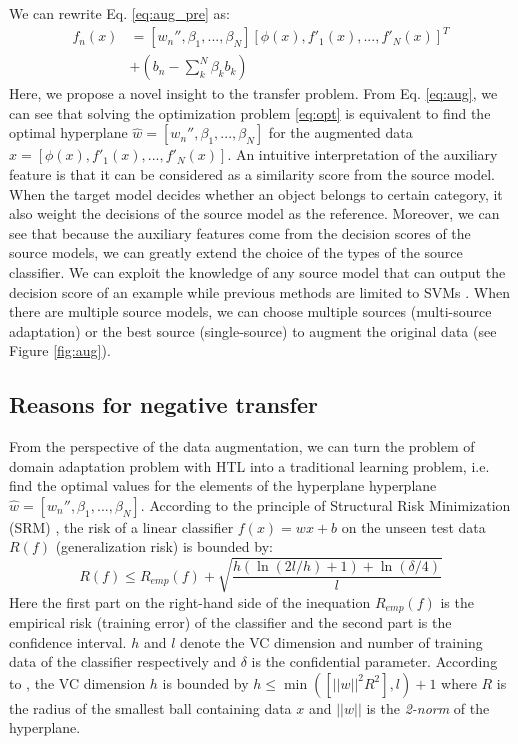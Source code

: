 We can rewrite Eq. \eqref{eq:aug_pre} as:
\begin{equation}\label{eq:aug}
\begin{aligned}
f_n(x)&= [w_{n}'',\beta_1,...,\beta_N][\phi(x),f'_1(x),...,f'_N(x)]^T\\&+(b_n-\sum\limits_k^N{\beta _kb_k})
\end{aligned}
\end{equation}
Here, we propose a novel insight to the transfer problem. From Eq. \eqref{eq:aug}, we can see that solving the optimization problem \eqref{eq:opt} is equivalent to find the optimal hyperplane $\hat{w}=[w_{n}'',\beta_1,...,\beta_N]$ for the augmented data $\hat{x}=[\phi(x),f'_1(x),...,f'_N(x)]$. An intuitive interpretation of the auxiliary feature is that it can be considered as a similarity score from the source model. When the target model decides whether an object belongs to certain category, it also weight the decisions of the source model as the reference.
Moreover, we can see that because the auxiliary features come from the decision scores of the source models, we can greatly extend the choice of the types of the source classifier. We can exploit the knowledge of any source model that can output the decision score of an example while previous methods are limited to SVMs \cite{tommasi2014learning} \cite{kuzborskij2013n}. When there are multiple source models, we can choose multiple sources (multi-source adaptation) or the best source (single-source) to augment the original data (see Figure \ref{fig:aug}).



\subsection{Reasons for negative transfer}
From the perspective of the data augmentation, we can turn the problem of domain adaptation problem with HTL into a traditional learning problem, i.e. find the optimal values for the elements of the hyperplane hyperplane $\hat{w}=[w_{n}'',\beta_1,...,\beta_N]$. According to the principle of Structural Risk Minimization (SRM) \cite{vapnik1999overview}, the risk of a linear classifier $f(x)=wx+b$ on the unseen test data $R(f)$ (generalization risk) is bounded by:
\begin{equation}\label{eq:srm}
R(f) \le {R_{emp}}(f) + \sqrt {\frac{{h(\ln (2l/h) + 1) + \ln (\delta /4)}}{l}} 
\end{equation}
Here the first part on the right-hand side of the inequation ${R_{emp}}(f)$ is the empirical risk (training error) of the classifier and the second part is the confidence interval. $h$ and $l$ denote the VC dimension and number of training data of the classifier respectively and $\delta$ is the confidential parameter. According to \cite{suykens1999least}, the VC dimension $h$ is bounded by $h \le \min([||w||^2R^2],l)+1$ where $R$ is the radius of the smallest ball containing data $x$ and $||w||$ is the \textit{2-norm} of the hyperplane.

